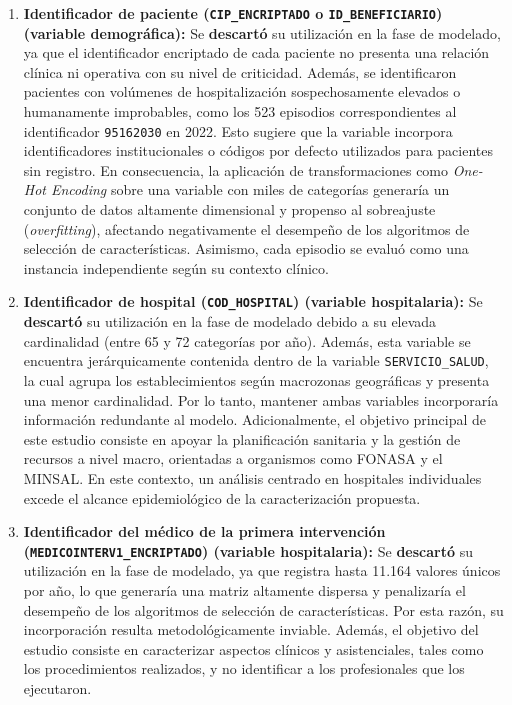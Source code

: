 \begin{enumerate}
    \item \textbf{Identificador de paciente (\texttt{CIP\_ENCRIPTADO} o \texttt{ID\_BENEFICIARIO}) (variable demográfica):} Se \textbf{descartó} su utilización en la fase de modelado, ya que el identificador encriptado de cada paciente no presenta una relación clínica ni operativa con su nivel de criticidad. Además, se identificaron pacientes con volúmenes de hospitalización sospechosamente elevados o humanamente improbables, como los 523 episodios correspondientes al identificador \texttt{95162030} en 2022. Esto sugiere que la variable incorpora identificadores institucionales o códigos por defecto utilizados para pacientes sin registro. En consecuencia, la aplicación de transformaciones como \textit{One-Hot Encoding} sobre una variable con miles de categorías generaría un conjunto de datos altamente dimensional y propenso al sobreajuste (\textit{overfitting}), afectando negativamente el desempeño de los algoritmos de selección de características. Asimismo, cada episodio se evaluó como una instancia independiente según su contexto clínico.
    \item \textbf{Identificador de hospital (\texttt{COD\_HOSPITAL}) (variable hospitalaria):} Se \textbf{descartó} su utilización en la fase de modelado debido a su elevada cardinalidad (entre 65 y 72 categorías por año). Además, esta variable se encuentra jerárquicamente contenida dentro de la variable \texttt{SERVICIO\_SALUD}, la cual agrupa los establecimientos según macrozonas geográficas y presenta una menor cardinalidad. Por lo tanto, mantener ambas variables incorporaría información redundante al modelo. Adicionalmente, el objetivo principal de este estudio consiste en apoyar la planificación sanitaria y la gestión de recursos a nivel macro, orientadas a organismos como FONASA y el MINSAL. En este contexto, un análisis centrado en hospitales individuales excede el alcance epidemiológico de la caracterización propuesta.
    \item \textbf{Identificador del médico de la primera intervención (\texttt{MEDICOINTERV1\_ENCRIPTADO}) (variable hospitalaria):} Se \textbf{descartó} su utilización en la fase de modelado, ya que registra hasta 11.164 valores únicos por año, lo que generaría una matriz altamente dispersa y penalizaría el desempeño de los algoritmos de selección de características. Por esta razón, su incorporación resulta metodológicamente inviable. Además, el objetivo del estudio consiste en caracterizar aspectos clínicos y asistenciales, tales como los procedimientos realizados, y no identificar a los profesionales que los ejecutaron.

\end{enumerate}
